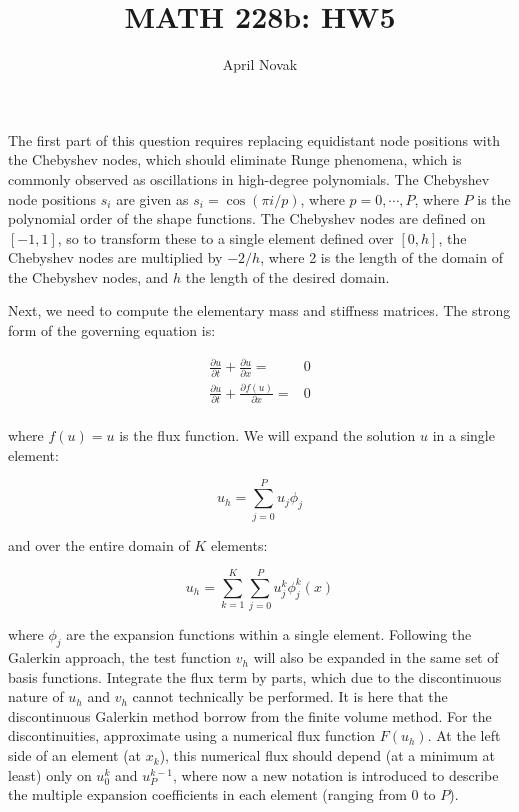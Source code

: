 \documentclass[10pt]{article}
\newcommand{\beq}{\begin{equation}}
\newcommand{\eeq}{\end{equation}}
\newcommand{\beqa}{\begin{equation}\begin{aligned}}
\newcommand{\eeqa}{\end{aligned}\end{equation}}
\begin{document}
\title{MATH 228b: HW5}
\author{April Novak}

\maketitle

\section{}

The first part of this question requires replacing equidistant node positions with the Chebyshev nodes, which should eliminate Runge phenomena, which is commonly observed as oscillations in high-degree polynomials. The Chebyshev node positions \(s_i\) are given as \(s_i=\cos{(\pi i/p)}\), where \(p=0, \cdots, P\), where \(P\) is the polynomial order of the shape functions. The Chebyshev nodes are defined on \([-1, 1]\), so to transform these to a single element defined over \([0, h]\), the Chebyshev nodes are multiplied by \(-2/h\), where 2 is the length of the domain of the Chebyshev nodes, and \(h\) the length of the desired domain.

Next, we need to compute the elementary mass and stiffness matrices. The strong form of the governing equation is:

\beqa
\frac{\partial u}{\partial t}+\frac{\partial u}{\partial x}=&0\\
\frac{\partial u}{\partial t}+\frac{\partial f(u)}{\partial x}=&0\\
\eeqa

where \(f(u)=u\) is the flux function. We will expand the solution \(u\) in a single element:

\beq
u_h=\sum_{j=0}^{P}u_j\phi_j
\eeq

and over the entire domain of \(K\) elements:

\beq
u_h=\sum_{k=1}^{K}\sum_{j=0}^{P}u_j^k\phi_j^k(x)
\eeq

where \(\phi_j\) are the expansion functions within a single element. Following the Galerkin approach, the test function \(v_h\) will also be expanded in the same set of basis functions. Integrate the flux term by parts, which due to the discontinuous nature of \(u_h\) and \(v_h\) cannot technically be performed. It is here that the discontinuous Galerkin method borrow from the finite volume method. For the discontinuities, approximate using a numerical flux function \(F(u_h)\). At the left side of an element (at \(x_{k}\)), this numerical flux should depend (at a minimum at least) only on \(u_0^k\) and \(u_P^{k-1}\), where now a new notation is introduced to describe the multiple expansion coefficients in each element (ranging from 0 to \(P\)). 
\end{document}
